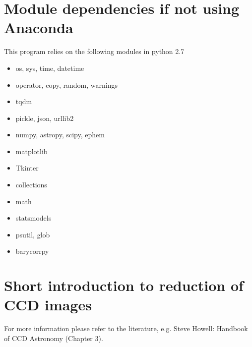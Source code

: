 \documentclass[10pt,a4paper]{article}
\begin{document}
\section{Module dependencies if not using Anaconda}
\label{section:module_dependency}
\noindent This program relies on the following modules in python 2.7

\begin{itemize}\setlength\itemsep{0em}
\item os, sys, time, datetime
\item operator, copy, random, warnings
\item tqdm
\item pickle, json, urllib2
\item numpy, astropy, scipy, ephem
\item matplotlib
\item Tkinter
\item collections
\item math
\item statsmodels
\item psutil, glob
\item barycorrpy
\end{itemize}





\newpage
\section{Short introduction to reduction of CCD images}
\label{Section:data_reduction_CCD}

For more information please refer to the literature, e.g. Steve Howell: Handbook of CCD Astronomy (Chapter 3).
\end{document}
